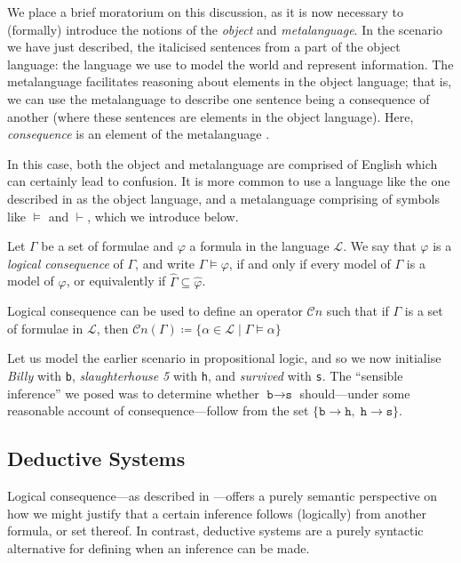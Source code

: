  
We place a brief moratorium on this discussion, as it is now necessary to (formally) introduce the notions of the \textit{object} and \textit{metalanguage}. In the scenario we have just described, the italicised sentences from a part of the object language: the language we use to model the world and represent information. The metalanguage facilitates reasoning about elements in the object language; that is, we can use the metalanguage to describe one sentence being a consequence of another (where these sentences are elements in the object language). Here, \textit{consequence} is an element of the metalanguage \cite[p 22]{Ben1993Mathematical}.

In this case, both the object and metalanguage are comprised of English which can certainly lead to confusion. It is more common to use a language like the one described in  as the object language, and a metalanguage comprising of symbols like $\vDash$ and $\vdash$, which we introduce below. 

\begin{definition}
     \label{definition:logical-consequence}
     Let $\Gamma$ be a set of formulae and $\varphi$ a formula in the language $\mathcal{L}$. We say that $\varphi$ is a \textit{logical consequence} of $\Gamma$, and write $\Gamma \vDash \varphi$, if and only if every model of $\Gamma$ is a model of $\varphi$, or equivalently if $\hat{\Gamma} \subseteq \hat{\varphi}$.
\end{definition}

Logical consequence can be used to define an operator $\mathcal{C}n$ such that if $\Gamma$ is a set of formulae in $\mathcal{L}$, then $\mathcal{C}n(\Gamma) \coloneqq \{\alpha \in \mathcal{L} \mid \Gamma \vDash \alpha\}$

\begin{example}
     \label{example-logical-consequence}   
Let us model the earlier scenario in propositional logic, and so we now initialise \textit{Billy} with \texttt{b}, \textit{slaughterhouse 5} with \texttt{h}, and \textit{survived} with \texttt{s}. The ``sensible inference'' we posed was to determine whether $\texttt{b} \rightarrow \texttt{s}$ should---under some reasonable account of consequence---follow from the set $\{\texttt{b} \rightarrow \texttt{h},\; \texttt{h} \rightarrow \texttt{s}\}$. 
\end{example}


\subsection{Deductive Systems}
\label{subsection:deduction-systems}
Logical consequence---as described in ---offers a purely semantic perspective on how we might justify that a certain inference follows (logically) from another formula, or set thereof. In contrast, deductive systems are a purely syntactic alternative for defining when an inference can be made. 

